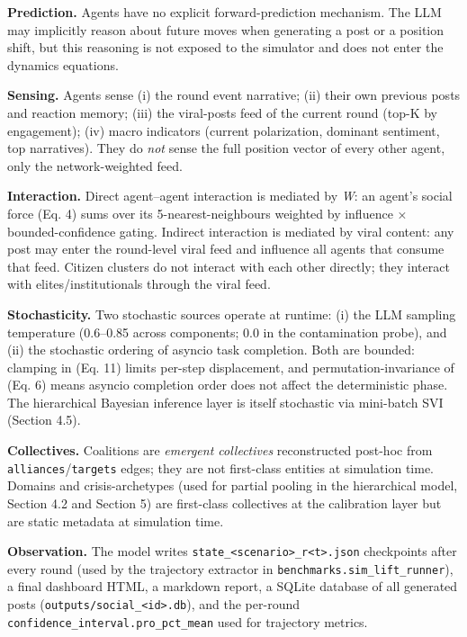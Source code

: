 \documentclass[
]{article}
\begin{document}
\textbf{Prediction.} Agents have no explicit forward-prediction
mechanism. The LLM may implicitly reason about future moves when
generating a post or a position shift, but this reasoning is not exposed
to the simulator and does not enter the dynamics equations.

\textbf{Sensing.} Agents sense (i) the round event narrative; (ii) their
own previous posts and reaction memory; (iii) the viral-posts feed of
the current round (top-K by engagement); (iv) macro indicators (current
polarization, dominant sentiment, top narratives). They do \emph{not}
sense the full position vector of every other agent, only the
network-weighted feed.

\textbf{Interaction.} Direct agent--agent interaction is mediated by
\emph{W}: an agent's social force (Eq. 4) sums over its
5-nearest-neighbours weighted by influence × bounded-confidence gating.
Indirect interaction is mediated by viral content: any post may enter
the round-level viral feed and influence all agents that consume that
feed. Citizen clusters do not interact with each other directly; they
interact with elites/institutionals through the viral feed.

\textbf{Stochasticity.} Two stochastic sources operate at runtime: (i)
the LLM sampling temperature (0.6--0.85 across components; 0.0 in the
contamination probe), and (ii) the stochastic ordering of asyncio task
completion. Both are bounded: clamping in (Eq. 11) limits per-step
displacement, and permutation-invariance of (Eq. 6) means asyncio
completion order does not affect the deterministic phase. The
hierarchical Bayesian inference layer is itself stochastic via
mini-batch SVI (Section 4.5).

\textbf{Collectives.} Coalitions are \emph{emergent collectives}
reconstructed post-hoc from \texttt{alliances}/\texttt{targets} edges;
they are not first-class entities at simulation time. Domains and
crisis-archetypes (used for partial pooling in the hierarchical model,
Section 4.2 and Section 5) are first-class collectives at the
calibration layer but are static metadata at simulation time.

\textbf{Observation.} The model writes
\texttt{state\_\textless{}scenario\textgreater{}\_r\textless{}t\textgreater{}.json}
checkpoints after every round (used by the trajectory extractor in
\texttt{benchmarks.sim\_lift\_runner}), a final dashboard HTML, a
markdown report, a SQLite database of all generated posts
(\texttt{outputs/social\_\textless{}id\textgreater{}.db}), and the
per-round \texttt{confidence\_interval.pro\_pct\_mean} used for
trajectory metrics.
\end{document}
